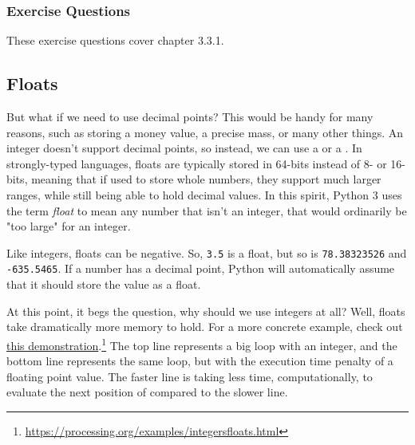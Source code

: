 \subsubsection*{Exercise Questions}
These exercise questions cover chapter 3.3.1. 
\begin{Exercise}
\end{Exercise}
\begin{Exercise}
\end{Exercise}
\begin{Exercise}
\end{Exercise}
\subsection{Floats}
But what if we need to use decimal points? This would be handy for many reasons, such as storing a money value, a precise mass, or many other things. An integer doesn't support decimal points, so instead, we can use a  or a . In strongly-typed languages, floats are typically stored in 64-bits instead of 8- or 16-bits, meaning that if used to store whole numbers, they support much larger ranges, while still being able to hold decimal values. In this spirit, Python 3 uses the term \textit{float} to mean any number that isn't an integer, that would ordinarily be "too large" for an integer.\par
Like integers, floats can be negative. So, \verb|3.5| is a float, but so is \verb|78.38323526| and \verb|-635.5465|. If a number has a decimal point, Python will automatically assume that it should store the value as a float.\par
At this point, it begs the question, why should we use integers at all? Well, floats take dramatically more memory to hold. For a more concrete example, check out \href{https://processing.org/examples/integersfloats.html}{this demonstration}.\footnote{\href{https://processing.org/examples/integersfloats.html}{https://processing.org/examples/integersfloats.html}} The top line represents a big loop with an integer, and the bottom line represents the same loop, but with the execution time penalty of a floating point value. The faster line is taking less time, computationally, to evaluate the next position of compared to the slower line.\par
